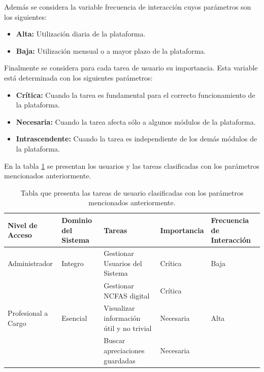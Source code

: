Además se considera la variable frecuencia de interacción cuyos parámetros son los siguientes: 

\begin{itemize}
	\item \textbf{Alta:} Utilización diaria de la plataforma.
	\item \textbf{Baja:} Utilización mensual o a mayor plazo de la plataforma.
\end{itemize} 

Finalmente se considera para cada tarea de usuario su importancia. Esta variable está determinada con los siguientes parámetros:

\begin{itemize}
	\item \textbf{Crítica:} Cuando la tarea es fundamental para el correcto funcionamiento de la plataforma.
	\item \textbf{Necesaria:} Cuando la tarea afecta sólo a algunos módulos de la plataforma.
	\item \textbf{Intrascendente:} Cuando la tarea es independiente de los demás módulos de la plataforma.
\end{itemize}

\clearpage
\newpage

En la tabla \ref{tareasuser}  se presentan los usuarios y las tareas clasificadas con los parámetros mencionados anteriormente.\\

\begin{table}[h]
	\centering
	\label{tareasuser}
\begin{tabular}{|p{2.5cm}|p{1.5cm}|p{6cm}|p{2cm}|p{2cm}|}
	\hline \textbf{Nivel de Acceso} & \textbf{Dominio del Sistema} & \textbf{Tareas} & \textbf{Importancia}  & \textbf{Frecuencia de Interacción}\\ 
	\hline Administrador & Integro &  Gestionar Usuarios del Sistema & Crítica & Baja \\
	\hline &  & Gestionar NCFAS digital & Crítica & \\
	\cline{3-4}
	Profesional a Cargo & Esencial & Visualizar información útil y no trivial & Necesaria  & Alta\\\cline{3-4} 
	&  & Buscar apreciaciones guardadas & Necesaria & \\ 
	\hline 
\end{tabular} 
\caption{Tabla que presenta las tareas de usuario clasificadas con los parámetros mencionados anteriormente.}
\end{table}

